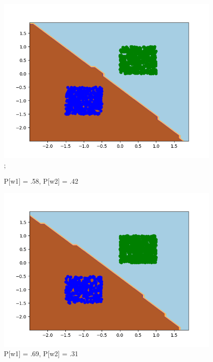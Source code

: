 \documentclass{article}
\begin{document}
\begin{figure}[!htb]
\begin{minipage}{0.24\textwidth}
		\includegraphics[scale=0.24]{../changingpriors/this17.png};
	\caption{P[w1] = .58, P[w2] = .42}
	\end{minipage}
	\begin{minipage}{0.24\textwidth}
			\centering
			\includegraphics[scale=0.24]{../changingpriors/this21.png}
			\caption{P[w1] = .69, P[w2] = .31}
	\end{minipage}
	\begin{minipage}{0.24\textwidth}
		\centering

\end{minipage}
\end{figure}
\end{document}

